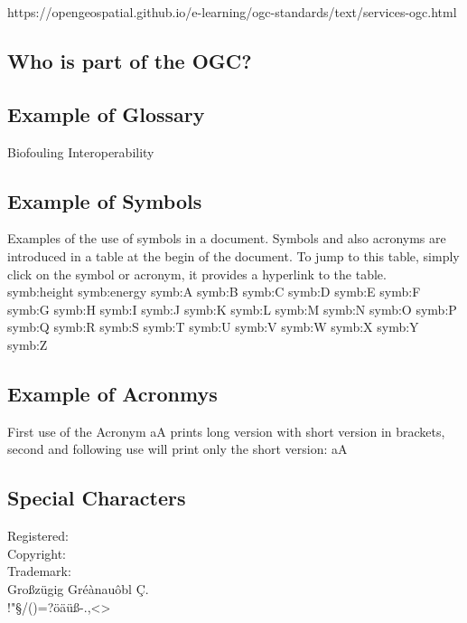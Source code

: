 \documentclass[class=scrbook, crop=false]{standalone}
\begin{document}
https://opengeospatial.github.io/e-learning/ogc-standards/text/services-ogc.html

    \subsection{Who is part of the OGC?}

    \subsection{Example of Glossary}
    \gls{Biofouling}
    \gls{Interoperability}

    \subsection{Example of Symbols}
    Examples of the use of symbols in a document. Symbols and also acronyms are introduced in a table at the begin of the document. To jump to this table, simply click on the symbol or acronym, it provides a hyperlink to the table.\\
    \gls{symb:height}
    \gls{symb:energy}
    \gls{symb:A}
    \gls{symb:B}
    \gls{symb:C}
    \gls{symb:D}
    \gls{symb:E}
    \gls{symb:F}
    \gls{symb:G}
    \gls{symb:H}
    \gls{symb:I}
    \gls{symb:J}
    \gls{symb:K}
    \gls{symb:L}
    \gls{symb:M}
    \gls{symb:N}
    \gls{symb:O}
    \gls{symb:P}
    \gls{symb:Q}
    \gls{symb:R}
    \gls{symb:S}
    \gls{symb:T}
    \gls{symb:U}
    \gls{symb:V}
    \gls{symb:W}
    \gls{symb:X}
    \gls{symb:Y}
    \gls{symb:Z}
    
    \subsection{Example of Acronmys}
    First use of the Acronym \gls{aA} prints long version with short version in brackets, second and following use will print only the short version: \gls{aA}
    
    \subsection{Special Characters}
    Registered: \TReg\\
    Copyright: \TCop\\
    Trademark: \TTra\\
    
    Großzügig Gréànauôbl Ç.\\
    !"§/()=?öäüß-.,<>\\
    
\end{document}
